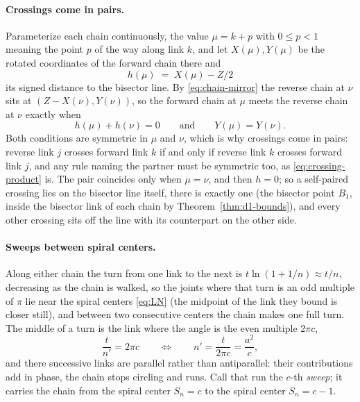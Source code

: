 \documentclass[11pt]{article}
\theoremstyle{definition}
\begin{document}
\paragraph{Crossings come in pairs.} Parameterize each chain continuously, the
value $\mu=k+p$ with $0\leq p<1$ meaning the point $p$ of the way along link
$k$, and let $X(\mu),Y(\mu)$ be the rotated coordinates of the forward chain
there and
\begin{equation}\label{eq:crossing-h}
h(\mu)\;=\;X(\mu)-Z/2
\end{equation}
its signed distance to the bisector line. By \eqref{eq:chain-mirror} the reverse
chain at $\nu$ sits at $(Z-X(\nu),Y(\nu))$, so the forward chain at $\mu$ meets
the reverse chain at $\nu$ exactly when
\begin{equation}\label{eq:crossing-conditions}
h(\mu)+h(\nu)=0
\qquad\text{and}\qquad
Y(\mu)=Y(\nu).
\end{equation}
Both conditions are symmetric in $\mu$ and $\nu$, which is why crossings come in
pairs: reverse link $j$ crosses forward link $k$ if and only if reverse link $k$
crosses forward link $j$, and any rule naming the partner must be symmetric
too, as \eqref{eq:crossing-product} is. The pair coincides only when $\mu=\nu$,
and then $h=0$; so a self-paired crossing lies on the bisector line itself, there
is exactly one (the bisector point $B_1$, inside the bisector link of each
chain by Theorem~\ref{thm:d1-bounds}), and every other crossing sits off the
line with its counterpart on the other side.

\paragraph{Sweeps between spiral centers.} Along either chain the turn from one
link to the next is $t\ln(1+1/n)\approx t/n$, decreasing as the chain is walked,
so the joints where that turn is an odd multiple of $\pi$ lie near the
spiral centers \eqref{eq:LN} (the midpoint of the link they bound is closer
still), and between two consecutive centers the chain makes
one full turn.
The middle of a turn is the link where the angle is the even multiple $2\pi c$,
\begin{equation}\label{eq:crossing-sweep}
\frac{t}{n'}=2\pi c
\qquad\Longleftrightarrow\qquad
n'=\frac{t}{2\pi c}=\frac{a^{2}}{c} ,
\end{equation}
and there successive links are parallel rather than antiparallel: their
contributions add in phase, the chain stops circling and runs. Call that run
the $c$-th \emph{sweep}; it carries the chain from the spiral center $S_n=c$ to
the spiral center $S_n=c-1$.
\end{document}
